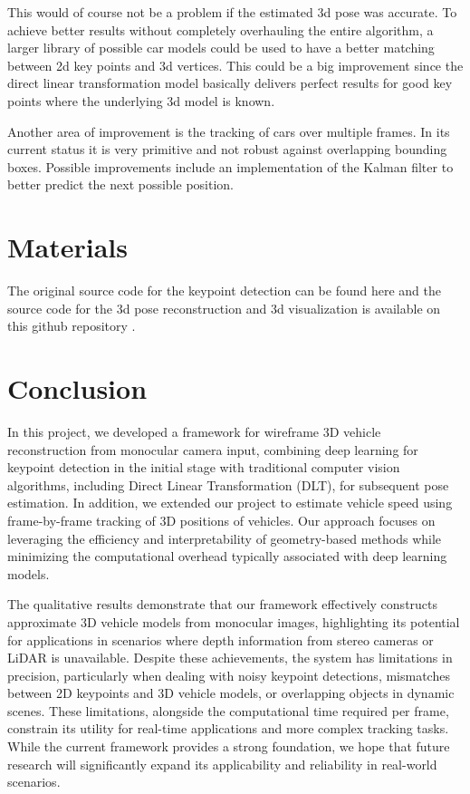 \documentclass[conference]{IEEEtran}
\begin{document}
This would of course not be a problem if the estimated 3d pose was accurate. To achieve better results without completely overhauling the entire algorithm, a larger library of possible car models could be used to have a better matching between 2d key points and 3d vertices. This could be a big improvement since the direct linear transformation model basically delivers perfect results for good key points where the underlying 3d model is known.

Another area of improvement is the tracking of cars over multiple frames. In its current status it is very primitive and not robust against overlapping bounding boxes. Possible improvements include an implementation of the Kalman filter to better predict the next possible position.

\section{Materials}

The original source code for the keypoint detection can be found here \cite{keypoints} and the source code for the 3d pose reconstruction and 3d visualization is available on this github repository \cite{keypoint2pose}.

\section{Conclusion}

In this project, we developed a framework for wireframe 3D vehicle reconstruction from monocular camera input, combining deep learning for keypoint detection in the initial stage with traditional computer vision algorithms, including Direct Linear Transformation (DLT), for subsequent pose estimation. In addition, we extended our project to estimate vehicle speed using frame-by-frame tracking of 3D positions of vehicles. Our approach focuses on leveraging the efficiency and interpretability of geometry-based methods while minimizing the computational overhead typically associated with deep learning models.

The qualitative results demonstrate that our framework effectively constructs approximate 3D vehicle models from monocular images, highlighting its potential for applications in scenarios where depth information from stereo cameras or LiDAR is unavailable. Despite these achievements, the system has limitations in precision, particularly when dealing with noisy keypoint detections, mismatches between 2D keypoints and 3D vehicle models, or overlapping objects in dynamic scenes. These limitations, alongside the computational time required per frame, constrain its utility for real-time applications and more complex tracking tasks. While the current framework provides a strong foundation, we hope that future research will significantly expand its applicability and reliability in real-world scenarios.



\end{document}
